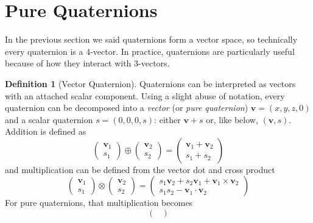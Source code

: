 \documentclass{amsart}
\theoremstyle{definition}
\newtheorem{definition}[theorem]{Definition}
\theoremstyle{remark}
\numberwithin{equation}{section}
\begin{document}
\section{Pure Quaternions}
In the previous section we said quaternions form a vector space, so technically every quaternion is a 4-vector.
In practice, quaternions are particularly useful because of how they interact with 3-vectors.
\begin{definition}[Vector Quaternion]
  Quaternions can be interpreted as vectors with an attached scalar component.
  Using a slight abuse of notation, every quaternion can be decomposed into a \emph{vector} (or \emph{pure quaternion}) $\mathbf{v} = \left(x, y, z, 0\right)$ and a scalar quaternion $s = \left(0,0,0,s\right)$: either $\mathbf{v}+s$ or, like below, $(\mathbf{v}, s)$.
  Addition is defined as
  \begin{equation}
    \begin{pmatrix}
      \mathbf{v}_1 \\
      s_1
    \end{pmatrix}
    \oplus
    \begin{pmatrix}
      \mathbf{v}_2 \\
      s_2
    \end{pmatrix}
    =
    \begin{pmatrix}
      \mathbf{v}_1 + \mathbf{v}_2\\
      s_1 + s_2
    \end{pmatrix} \nonumber
  \end{equation}
  and multiplication can be defined from the vector dot and cross product
  \begin{equation}
    \begin{pmatrix}
      \mathbf{v}_1 \\
      s_1
    \end{pmatrix}
    \otimes
    \begin{pmatrix}
      \mathbf{v}_2 \\
      s_2
    \end{pmatrix}
    =
    \begin{pmatrix}
      s_1\mathbf{v}_2 + s_2\mathbf{v}_1 + \mathbf{v}_1 \times \mathbf{v}_2 \\
      s_1s_2 - \mathbf{v}_1 \cdot \mathbf{v}_2
    \end{pmatrix} \nonumber
  \end{equation}
  For pure quaternions, that multiplication becomes
  \begin{equation}
    \begin{pmatrix}

\end{pmatrix}
\end{equation}
\end{definition}
\end{document}
